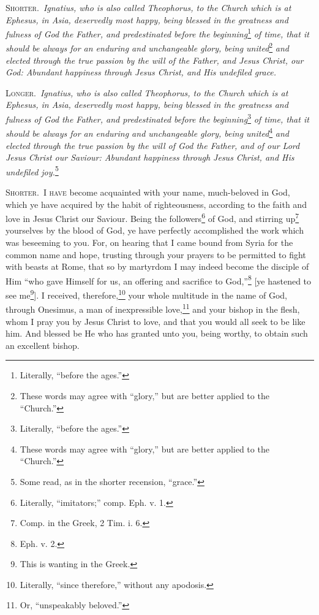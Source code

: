 
\textsc{Shorter.}~\emph{Ignatius, who is also called Theophorus, to the Church which is at Ephesus, in Asia, deservedly most happy, being blessed in the greatness and fulness of God the Father, and predestinated before the beginning}\footnote{Literally, “before the ages.”}\emph{ of time, that it should be always for an enduring and unchangeable glory, being united}\footnote{These words may agree with “glory,” but are better applied to the “Church.”}\emph{ and elected through the true passion by the will of the Father, and Jesus Christ, our God: Abundant happiness through Jesus Christ, and His undefiled grace.}

\textsc{Longer.}~\emph{Ignatius, who is also called Theophorus, to the Church which is at Ephesus, in Asia, deservedly most happy, being blessed in the greatness and fulness of God the Father, and predestinated before the beginning}\footnote{Literally, “before the ages.”}\emph{ of time, that it should be always for an enduring and unchangeable glory, being united}\footnote{These words may agree with “glory,” but are better applied to the “Church.”}\emph{ and elected through the true passion by the will of God the Father, and of our Lord Jesus Christ our Saviour: Abundant happiness through Jesus Christ, and His undefiled joy.}\footnote{Some read, as in the shorter recension, “grace.”}


\textsc{Shorter.}~\textsc{I have} become acquainted with your name, much-beloved in God, which ye have acquired by the habit of righteousness, according to the faith and love in Jesus Christ our Saviour. Being the followers\footnote{Literally, “imitators;” comp. Eph. v. 1.} of God, and stirring up\footnote{Comp. in the Greek, 2 Tim. i. 6.} yourselves by the blood of God, ye have perfectly accomplished the work which was beseeming to you. For, on hearing that I came bound from Syria for the common name and hope, trusting through your prayers to be permitted to fight with beasts at Rome, that so by martyrdom I may indeed become the disciple of Him “who gave Himself for us, an offering and sacrifice to God,”\footnote{Eph. v. 2.} [ye hastened to see me\footnote{This is wanting in the Greek.}]. I received, therefore,\footnote{Literally, “since therefore,” without any apodosis.} your whole multitude in the name of God, through Onesimus, a man of inexpressible love,\footnote{Or, “unspeakably beloved.”} and your bishop in the flesh, whom I pray you by Jesus Christ to love, and that you would all seek to be like him. And blessed be He who has granted unto you, being worthy, to obtain such an excellent bishop.

